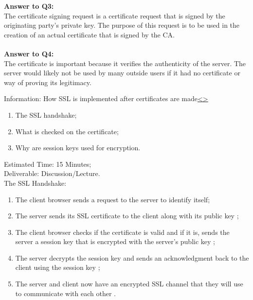 \documentclass[12pt]{extarticle}
\newenvironment{instructionblock}{\Large\bgroup}{\egroup}
\newcommand{\ben}{\begin{enumerate}}
\newcommand{\een}{\end{enumerate}}
\begin{document}
\vspace{2mm}
\noindent
\textbf{Answer to Q3:}\\
The certificate signing request is a certificate request that is signed by the originating party's private key. The purpose of this request is to be used in the creation of an actual certificate that is signed by the CA.\\\\
\noindent
\textbf{Answer to Q4:}\\
The certificate is important because it verifies the authenticity of the server. The server would likely not be used by many outside users if it had no certificate or way of proving its legitimacy.


\pagebreak
\begin{slide}{Information: How SSL is implemented after certificates are made}{\hyperref[slide 14]{\textless}\hyperref[slide 16]{\textgreater}}
	\vskip 5pt
	\begin{instructionblock}
	\ben
		\item The SSL handshake;
		\item What is checked on the certificate;
		\item Why are session keys used for encryption.
	\een
	\end{instructionblock}
\end{slide}
\noindent
Estimated Time: 15 Minutes; \\
Deliverable: Discussion/Lecture.\\


\vspace*{10mm}
\noindent
The SSL Handshake:
	\ben
		\item The client browser sends a request to the server to identify itself; \cite{digicert}
		\item The server sends its SSL certificate to the client along with its public key \cite{digicert};
		\item The client browser checks if the certificate is valid and if it is, sends the server a session key that is encrypted with the server's public key \cite{digicert};
		\item The server decrypts the session key and sends an acknowledgment back to the client using the session key \cite{digicert};
		\item The server and client now have an encrypted SSL channel that they will use to communicate with each other \cite{digicert}.
	\een
\end{document}
